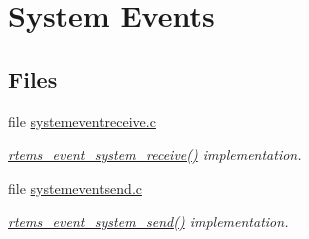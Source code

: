 \hypertarget{group__ClassicEventSystem}{}\section{System Events}
\label{group__ClassicEventSystem}
\subsection*{Files}
\begin{DoxyCompactItemize}
\item 
file \mbox{\hyperlink{systemeventreceive_8c}{systemeventreceive.\+c}}
\begin{DoxyCompactList}\small\item\em \mbox{\hyperlink{group__ClassicEventSystem_ga10c79eebe1e9c1b00eb72017bb67daf7}{rtems\+\_\+event\+\_\+system\+\_\+receive()}} implementation. \end{DoxyCompactList}\item 
file \mbox{\hyperlink{systemeventsend_8c}{systemeventsend.\+c}}
\begin{DoxyCompactList}\small\item\em \mbox{\hyperlink{group__ClassicEventSystem_ga1119cb4341890e86ffa7cc7fad414f19}{rtems\+\_\+event\+\_\+system\+\_\+send()}} implementation. \end{DoxyCompactList}\end{DoxyCompactItemize}
